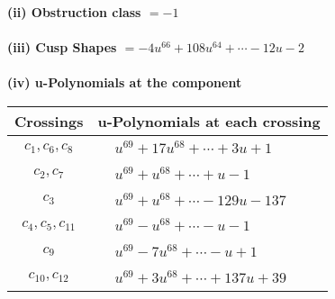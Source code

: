 \documentclass[1p]{elsarticle_modified}
\theoremstyle{definition}
\begin{document}
\flushleft \textbf{(ii) Obstruction class $= -1$}\\~\\
\flushleft \textbf{(iii) Cusp Shapes $= -4 u^{66}+108 u^{64}+\cdots-12 u-2$}\\~\\
\newpage\renewcommand{\arraystretch}{1}
\flushleft \textbf{(iv) u-Polynomials at the component}\newline \\
\begin{tabular}{m{50pt}|m{274pt}}
Crossings & \hspace{64pt}u-Polynomials at each crossing \\
\hline $$\begin{aligned}c_{1},c_{6},c_{8}\end{aligned}$$&$\begin{aligned}
&u^{69}+17 u^{68}+\cdots+3 u+1
\end{aligned}$\\
\hline $$\begin{aligned}c_{2},c_{7}\end{aligned}$$&$\begin{aligned}
&u^{69}+u^{68}+\cdots+u-1
\end{aligned}$\\
\hline $$\begin{aligned}c_{3}\end{aligned}$$&$\begin{aligned}
&u^{69}+u^{68}+\cdots-129 u-137
\end{aligned}$\\
\hline $$\begin{aligned}c_{4},c_{5},c_{11}\end{aligned}$$&$\begin{aligned}
&u^{69}- u^{68}+\cdots- u-1
\end{aligned}$\\
\hline $$\begin{aligned}c_{9}\end{aligned}$$&$\begin{aligned}
&u^{69}-7 u^{68}+\cdots- u+1
\end{aligned}$\\
\hline $$\begin{aligned}c_{10},c_{12}\end{aligned}$$&$\begin{aligned}
&u^{69}+3 u^{68}+\cdots+137 u+39
\end{aligned}$\\
\hline
\end{tabular}\\~\\
\end{document}
